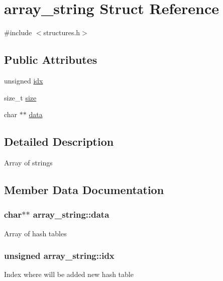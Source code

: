 \hypertarget{structarray__string}{}\section{array\+\_\+string Struct Reference}
\label{structarray__string}


{\ttfamily \#include $<$structures.\+h$>$}

\subsection*{Public Attributes}
\begin{DoxyCompactItemize}
\item 
unsigned \hyperlink{structarray__string_aa2d57de40d2c620b52744a77cdf9c342}{idx}
\item 
size\+\_\+t \hyperlink{structarray__string_a60c13969c1fb29949906ea61bb306b37}{size}
\item 
char $\ast$$\ast$ \hyperlink{structarray__string_abb507ab84fd5c9e2f585f18571faa414}{data}
\end{DoxyCompactItemize}


\subsection{Detailed Description}
Array of strings 

\subsection{Member Data Documentation}
\subsubsection[{\texorpdfstring{data}{data}}]{\setlength{\rightskip}{0pt plus 5cm}char$\ast$$\ast$ array\+\_\+string\+::data}\hypertarget{structarray__string_abb507ab84fd5c9e2f585f18571faa414}{}\label{structarray__string_abb507ab84fd5c9e2f585f18571faa414}
Array of hash tables 
\subsubsection[{\texorpdfstring{idx}{idx}}]{\setlength{\rightskip}{0pt plus 5cm}unsigned array\+\_\+string\+::idx}\hypertarget{structarray__string_aa2d57de40d2c620b52744a77cdf9c342}{}\label{structarray__string_aa2d57de40d2c620b52744a77cdf9c342}
Index where will be added new hash table 
